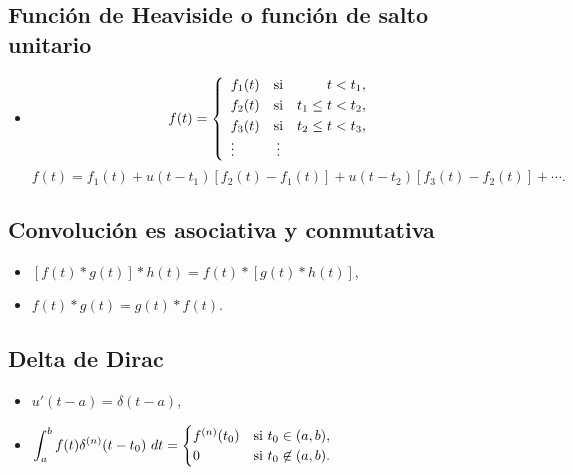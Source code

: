 \documentclass[a4,10pt,comentarios]{aleph-notas}
\newcommand{\intd}[4]{\displaystyle\int^{#2}_{#1} #3\ d#4}
\begin{document}
\subsection{Función de Heaviside o función de salto unitario}
\begin{itemize}[leftmargin=*]
\item
    \[
        f(t)=\left\{\begin{array}{l c r}
        f_1(t)&\text{si}&t<t_1,\\[1mm]
        f_2(t)&\text{si}&t_1\leq t<t_2,\\[1mm]
        f_3(t)&\text{si}&t_2\leq t<t_3,\\ \vdots&\vdots
        \end{array}\right.
    \]
    \[
        f(t)=f_1(t)+u(t-t_1)[f_2(t)-f_1(t)]+u(t-t_2)[f_3(t)-f_2(t)]+\cdots.
    \]
\end{itemize}

\subsection{Convolución es asociativa y conmutativa}
\begin{itemize}[leftmargin=*]
\item $[f(t)\ast g(t)]\ast h(t)=f(t)\ast [g(t)\ast h(t)]$,
\item $f(t)\ast g(t)=g(t)\ast f(t)$.
\end{itemize}

\subsection{Delta de Dirac}
\begin{itemize}[leftmargin=*]
\item $u'(t-a)=\delta(t-a)$,
\item $\displaystyle \intd{a}{b}{f(t)\delta^{(n)}(t-t_0)}{t}=
        \begin{cases}
            f^{(n)}(t_0) &\text{si } t_0\in(a,b),\\
            0       &\text{si }  t_0\not\in(a,b).
        \end{cases}$
\end{itemize}
\end{document}
